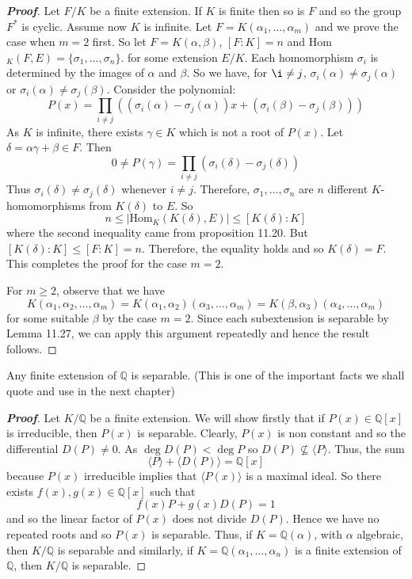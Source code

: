 \begin{proof}[\bf Proof] Let $F/K$ be a finite extension. If $K$ is finite then so is $F$ and so the group $F^*$ is cyclic.
Assume now $K$ is infinite. Let $F=K(\alpha_1,\ldots,\alpha_m)$ and we prove the case when $m=2$ first. So let
$F=K(\alpha,\beta)$, $[F:K]=n$ and Hom$_K(F,E)=\{\sigma_1,\ldots,\sigma_n\}$. for some extension $E/K$. Each homomorphism $\sigma_i$ is determined by the images of $\alpha$ and $\beta$. So we have, for $\i \neq j$, $\sigma_i(\alpha) \neq \sigma_j (\alpha)$ or $\sigma_i(\alpha) \neq \sigma_j(\beta)$. Consider the polynomial:
$$P(x)=\prod_{i \neq j}\left((\sigma_i(\alpha)-\sigma_j(\alpha))x+(\sigma_i(\beta)-\sigma_j(\beta))\right)$$
As $K$ is infinite, there exists $\gamma \in K$ which is not a root of $P(x)$. Let $\delta=\alpha\gamma+\beta \in F$.
Then
$$0 \neq P(\gamma)=\prod_{i \neq j}(\sigma_i(\delta)-\sigma_j(\delta))$$
Thus $\sigma_i(\delta) \neq \sigma_j(\delta)$ whenever $i \neq j$.
Therefore, $\sigma_1,\ldots,\sigma_n$ are $n$ different $K$-homomorphisms from $K(\delta)$ to $E$.
So
$$n \le \left|\text{Hom}_K(K(\delta),E)\right| \le [K(\delta):K]$$
where the second inequality came from proposition 11.20. But $[K(\delta):K] \le [F:K]=n$. Therefore, the equality holds and so $K(\delta)=F$. This completes the proof for the case $m=2$.

For $m \ge 2$, observe that we have
$$K(\alpha_1,\alpha_2,\ldots,\alpha_m)=K(\alpha_1,\alpha_2)(\alpha_3,\ldots,\alpha_m)
=K(\beta,\alpha_3)(\alpha_4,\ldots,\alpha_m)$$
for some suitable $\beta$ by the case $m=2$. Since each subextension is separable by Lemma 11.27, we can apply this argument repeatedly and hence the result follows.
\end{proof}
\begin{theorem} Any finite extension of $\mathbb{Q}$ is separable. (This is one of the important facts we shall quote and use in the next chapter)
\end{theorem}
\begin{proof}[\bf Proof] Let $K/\mathbb{Q}$ be a finite extension. We will show firstly that if $P(x) \in \mathbb{Q}[x]$ is irreducible, then $P(x)$ is separable. Clearly, $P(x)$ is non constant and so the differential $D(P) \neq 0$. As
$\deg{D(P)} <\deg{P}$ so $D(P) \not \subseteq \langle P \rangle$. Thus, the sum
$$\langle P \rangle + \langle D(P) \rangle =\mathbb{Q}[x]$$ because $P(x)$ irreducible implies that
$\langle P(x) \rangle$ is a maximal ideal. So there exists $f(x),g(x) \in \mathbb{Q}[x]$ such that
$$f(x)P+g(x)D(P)=1$$ and so the linear factor of $P(x)$ does not divide $D(P)$. Hence we have no repeated roots and so $P(x)$ is separable. Thus, if $K=\mathbb{Q}(\alpha)$, with $\alpha$ algebraic, then $K/\mathbb{Q}$ is separable and similarly, if $K=\mathbb{Q}(\alpha_1,\ldots,\alpha_n)$ is a finite extension of $\mathbb{Q}$, then $K/\mathbb{Q}$ is separable.
\end{proof}
